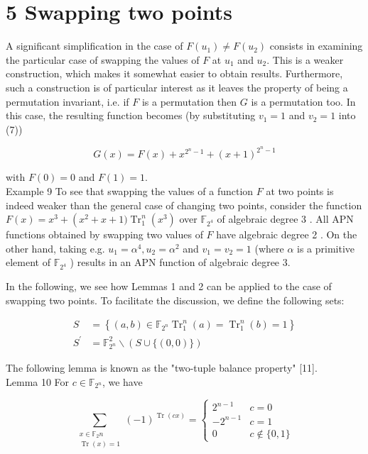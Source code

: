 \documentclass[10pt]{article}
\begin{document}
\section*{5 Swapping two points}
A significant simplification in the case of $F\left(u_{1}\right) \neq F\left(u_{2}\right)$ consists in examining the particular case of swapping the values of $F$ at $u_{1}$ and $u_{2}$. This is a weaker construction, which makes it somewhat easier to obtain results. Furthermore, such a construction is of particular interest as it leaves the property of being a permutation invariant, i.e. if $F$ is a permutation then $G$ is a permutation too. In this case, the resulting function becomes (by substituting $v_{1}=1$ and $v_{2}=1$ into (7))


\begin{equation*}
G(x)=F(x)+x^{2^{n}-1}+(x+1)^{2^{n}-1} \tag{12}
\end{equation*}


with $F(0)=0$ and $F(1)=1$.\\
Example 9 To see that swapping the values of a function $F$ at two points is indeed weaker than the general case of changing two points, consider the function $F(x)=x^{3}+\left(x^{2}+\right. x+1) \operatorname{Tr}_{1}^{n}\left(x^{3}\right)$ over $\mathbb{F}_{2^{4}}$ of algebraic degree 3 . All APN functions obtained by swapping two values of $F$ have algebraic degree 2 . On the other hand, taking e.g. $u_{1}=\alpha^{4}, u_{2}=\alpha^{2}$ and $v_{1}=v_{2}=1$ (where $\alpha$ is a primitive element of $\mathbb{F}_{2^{4}}$ ) results in an APN function of algebraic degree 3.

In the following, we see how Lemmas 1 and 2 can be applied to the case of swapping two points. To facilitate the discussion, we define the following sets:


\begin{align*}
S & =\left\{(a, b) \in \mathbb{F}_{2^{n}} \operatorname{Tr}_{1}^{n}(a)=\operatorname{Tr}_{1}^{n}(b)=1\right\}  \tag{13}\\
S^{\prime} & =\mathbb{F}_{2^{n}}^{2} \backslash(S \cup\{(0,0)\}) \tag{14}
\end{align*}


The following lemma is known as the "two-tuple balance property" [11].\\
Lemma 10 For $c \in \mathbb{F}_{2^{n}}$, we have

$$
\sum_{\substack{x \in \mathbb{F}_{2} n \\ \operatorname{Tr}(x)=1}}(-1)^{\operatorname{Tr}(c x)}= \begin{cases}2^{n-1} & c=0 \\ -2^{n-1} & c=1 \\ 0 & c \notin\{0,1\}\end{cases}
$$
\end{document}

